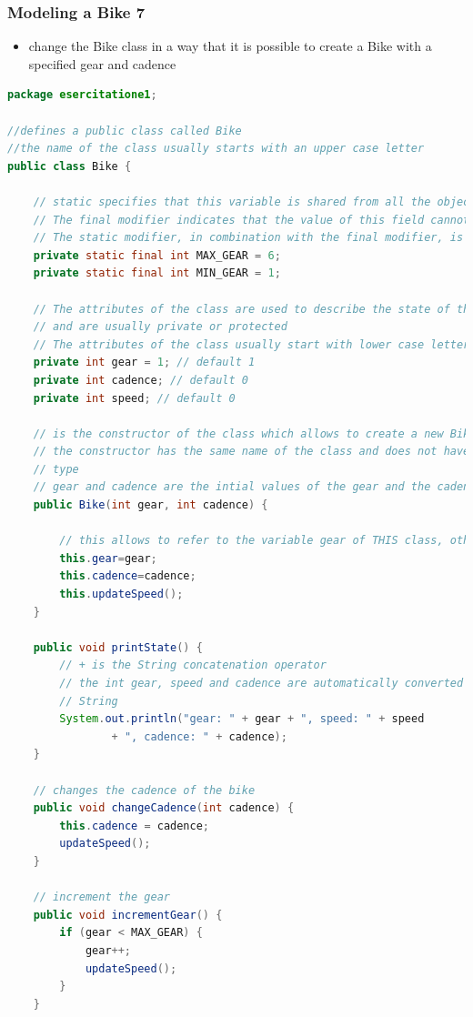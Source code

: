 \documentclass{article}
\theoremstyle{definition}
\begin{document}
\subsubsection{Modeling a Bike 7}
\begin{itemize}
\item change the Bike class in a way that it is possible to create a Bike with a specified gear and cadence
\end{itemize}

\begin{lstlisting}[language=Java,escapechar=|]
package esercitatione1;

//defines a public class called Bike 
//the name of the class usually starts with an upper case letter
public class Bike {

	// static specifies that this variable is shared from all the objects
	// The final modifier indicates that the value of this field cannot change.
 	// The static modifier, in combination with the final modifier, is also used to define constants. 
	private static final int MAX_GEAR = 6;
	private static final int MIN_GEAR = 1;

	// The attributes of the class are used to describe the state of the class
	// and are usually private or protected
	// The attributes of the class usually start with lower case letters
	private int gear = 1; // default 1
	private int cadence; // default 0
	private int speed; // default 0

	// is the constructor of the class which allows to create a new Bike
	// the constructor has the same name of the class and does not have a return
	// type
	// gear and cadence are the intial values of the gear and the cadence
	public Bike(int gear, int cadence) {
		
		// this allows to refer to the variable gear of THIS class, otherwise gear refers to the variable passed as parameter
		this.gear=gear;
		this.cadence=cadence;
		this.updateSpeed();
	}

	public void printState() {
		// + is the String concatenation operator
		// the int gear, speed and cadence are automatically converted into
		// String
		System.out.println("gear: " + gear + ", speed: " + speed
				+ ", cadence: " + cadence);
	}

	// changes the cadence of the bike
	public void changeCadence(int cadence) {
		this.cadence = cadence;
		updateSpeed();
	}

	// increment the gear
	public void incrementGear() {
		if (gear < MAX_GEAR) {
			gear++;
			updateSpeed();
		}
	}


\end{lstlisting}
\end{document}
